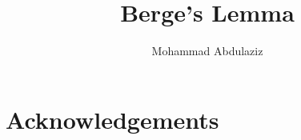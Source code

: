 \documentclass[11pt,a4paper]{article}
\begin{document}
\title{Berge's Lemma}
\author{Mohammad Abdulaziz}
\maketitle

\begin{abstract}
\end{abstract}


\section{Acknowledgements}





\end{document}
